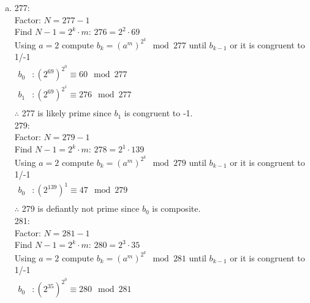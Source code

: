 \documentclass[fleqn, 12pt]{article}
\begin{document}
\begin{enumerate}[a)]
    \item
        277:\\

        Factor: $N = 277-1$\\
        Find $N-1=2^k \cdot m$: $276=2^2 \cdot 69$\\
        Using $a=2$ compute $b_k={(a^m)}^{2^k} \mod 277$ until $b_{k-1}$ or it is congruent to 1/-1\\

        $
            \begin{aligned}
                b_0 &: (2^{69})^{2^0} \equiv 60 \mod 277\\
                b_1 &: (2^{69})^{2^1} \equiv 276 \mod 277\\
            \end{aligned}
        $\\

        $\therefore$ 277 is likely prime since $b_1$ is congruent to -1.\\

        279:\\

        Factor: $N = 279-1$\\
        Find $N-1=2^k \cdot m$: $278=2^1 \cdot 139$\\
        Using $a=2$ compute $b_k={(a^m)}^{2^k} \mod 279$ until $b_{k-1}$ or it is congruent to 1/-1\\

        $
            \begin{aligned}
                b_0 &: (2^{139})^1 \equiv 47 \mod 279\\
            \end{aligned}
        $\\

        $\therefore$ 279 is defiantly not prime since $b_0$ is composite.\\

        281:\\

        Factor: $N = 281-1$\\
        Find $N-1=2^k \cdot m$: $280=2^3 \cdot 35$\\
        Using $a=2$ compute $b_k={(a^m)}^{2^k} \mod 281$ until $b_{k-1}$ or it is congruent to 1/-1\\

        $
            \begin{aligned}
                b_0 &: (2^{35})^{2^0} \equiv 280 \mod 281\\
            \end{aligned}
        $\\


\end{enumerate}
\end{document}
